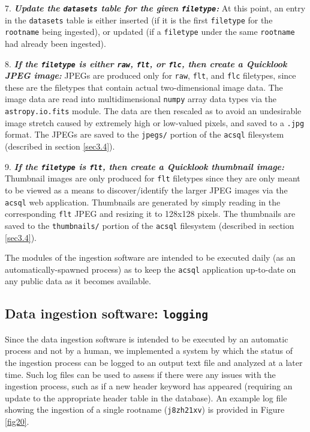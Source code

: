 \documentclass[10pt,journal,compsoc]{IEEEtran}
\begin{document}
7. \textbf{\textit{Update the \texttt{datasets} table for the given \texttt{filetype}:}} At this point, an entry in the \texttt{datasets} table is either inserted (if it is the first
\texttt{filetype} for the \texttt{rootname} being ingested), or updated (if a \texttt{filetype} under the same \texttt{rootname} had already been ingested).

8. \textbf{\textit{If the \texttt{filetype} is either \texttt{raw}, \texttt{flt}, or \texttt{flc}, then create a Quicklook JPEG image:}}  JPEGs are produced only for \texttt{raw},
\texttt{flt}, and \texttt{flc} filetypes, since these are the filetypes that contain actual two-dimensional image data.  The image data are read into multidimensional \texttt{numpy} array
data types via the \texttt{astropy.io.fits} module.  The data are then rescaled as to avoid an undesirable image stretch caused by extremely high or low-valued pixels, and saved to a
\texttt{.jpg} format.  The JPEGs are saved to the \texttt{jpegs/} portion of the \texttt{acsql} filesystem (described in section \ref{sec3.4}).

9. \textbf{\textit{If the \texttt{filetype} is \texttt{flt}, then create a Quicklook thumbnail image:}} Thumbnail images are only produced for \texttt{flt} filetypes since they
are only meant to be viewed as a means to discover/identify the larger JPEG images via the \texttt{acsql} web application.  Thumbnails are generated by simply reading in the corresponding
\texttt{flt} JPEG and resizing it to 128x128 pixels.  The thumbnails are saved to the \texttt{thumbnails/} portion of the \texttt{acsql} filesystem (described in section \ref{sec3.4}).

The modules of the ingestion software are intended to be executed daily (as an automatically-spawned process) as to keep the \texttt{acsql} application up-to-date on any public data as it
becomes available.


\subsection{Data ingestion software: \texttt{logging}} \label{sec3.8}

Since the data ingestion software is intended to be executed by an automatic process and not by a human, we implemented a system by which the status of the ingestion process can be logged
to an output text file and analyzed at a later time.  Such log files can be used to assess if there were any issues with the ingestion process, such as if a new header keyword has
appeared (requiring an update to the appropriate header table in the database).  An example log file showing the ingestion of a single rootname (\texttt{j8zh21xv}) is provided in Figure
\ref{fig20}.
\end{document}
